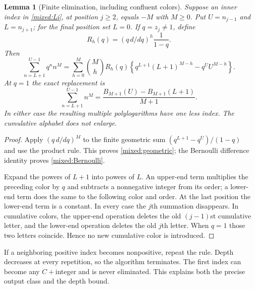 \documentclass[11pt]{article}
\numberwithin{equation}{section}
\theoremstyle{plain}
\newtheorem{lemma}[theorem]{Lemma}
\theoremstyle{definition}
\theoremstyle{remark}
\begin{document}
\begin{lemma}[Finite elimination, including confluent colors]
\label{mixed:eliminate}
Suppose an inner index in \eqref{mixed:Li}, at position $j\ge2$,
equals $-M$ with $M\ge0$. Put $U=n_{j-1}$ and $L=n_{j+1}$;
for the final position set $L=0$. If $q=z_j\ne1$, define
\[
 R_h(q)=(q\,d/dq)^h\frac1{1-q}.
\]
Then
\begin{equation}\label{mixed:geometric}
 \sum_{n=L+1}^{U-1}q^n n^M
 =\sum_{h=0}^M\binom Mh R_h(q)
       \left\{q^{L+1}(L+1)^{M-h}-q^U U^{M-h}\right\}.
\end{equation}
At $q=1$ the exact replacement is
\begin{equation}\label{mixed:Bernoulli}
 \sum_{n=L+1}^{U-1}n^M
       =\frac{B_{M+1}(U)-B_{M+1}(L+1)}{M+1}.
\end{equation}
In either case the resulting multiple polylogarithms have one less
index. The cumulative alphabet does not enlarge.
\end{lemma}
\begin{proof}
Apply $(q\,d/dq)^M$ to the finite geometric sum
$(q^{L+1}-q^U)/(1-q)$ and use the product rule. This proves
\eqref{mixed:geometric}; the Bernoulli difference identity proves
\eqref{mixed:Bernoulli}.

Expand the powers of $L+1$ into powers of $L$. An upper-end term
multiplies the preceding color by $q$ and subtracts a nonnegative
integer from its order; a lower-end term does the same to the following
color and order. At the last position the lower-end term is a constant.
In every case the $j$th summation disappears. In cumulative colors,
the upper-end operation deletes the old $(j-1)$st cumulative letter,
and the lower-end operation deletes the old $j$th letter. When $q=1$
those two letters coincide. Hence no new cumulative color is introduced.
\end{proof}

If a neighboring positive index becomes nonpositive, repeat the rule.
Depth decreases at every repetition, so the algorithm terminates.
The first index can become any $C+$integer and is never eliminated.
This explains both the precise output class and the depth bound.
\end{document}
